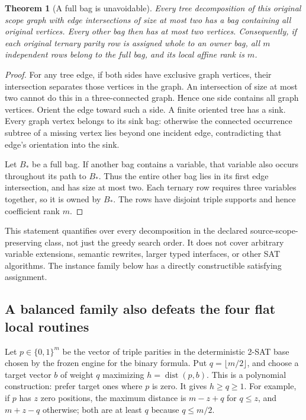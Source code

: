 \documentclass[11pt]{article}
\newtheorem{theorem}{Theorem}
\begin{document}
\begin{theorem}[A full bag is unavoidable]
Every tree decomposition of this original scope graph with edge intersections
of size at most two has a bag containing all original vertices. Every other
bag then has at most two vertices. Consequently, if each original ternary
parity row is assigned whole to an owner bag, all \(m\) independent rows
belong to the full bag, and its local affine rank is \(m\).
\end{theorem}
\begin{proof}
For any tree edge, if both sides have exclusive graph vertices, their
intersection separates those vertices in the graph. An intersection of size
at most two cannot do this in a three-connected graph. Hence one side
contains all graph vertices. Orient the edge toward such a side. A finite
oriented tree has a sink. Every graph vertex belongs to its sink bag:
otherwise the connected occurrence subtree of a missing vertex lies beyond
one incident edge, contradicting that edge's orientation into the sink.

Let \(B_*\) be a full bag. If another bag contains a variable, that variable
also occurs throughout its path to \(B_*\). Thus the entire other bag lies
in its first edge intersection, and has size at most two. Each ternary row
requires three variables together, so it is owned by \(B_*\). The rows
have disjoint triple supports and hence coefficient rank \(m\).
\end{proof}

This statement quantifies over every decomposition in the declared
source-scope-preserving class, not just the greedy search order. It does not
cover arbitrary variable extensions, semantic rewrites, larger typed
interfaces, or other SAT algorithms. The instance family below has a directly
constructible satisfying assignment.

\subsection*{A balanced family also defeats the four flat local routines}
Let \(p\in\{0,1\}^m\) be the vector of triple parities in the deterministic
2-SAT base chosen by the frozen engine for the binary formula. Put
\(q=\lfloor m/2\rfloor\), and choose a target vector \(b\) of weight
\(q\) maximizing \(h=\operatorname{dist}(p,b)\). This is a polynomial
construction: prefer target ones where \(p\) is zero. It gives \(h\ge q\ge1\).
For example, if \(p\) has \(z\) zero positions, the maximum distance is
\(m-z+q\) for \(q\le z\), and \(m+z-q\) otherwise; both are at least
\(q\) because \(q\le m/2\).
\end{document}
